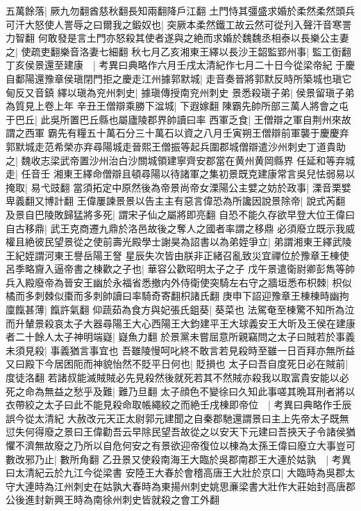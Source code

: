 五萬餘落|{
	厥九勿翻酋慈秋翻長知兩翻降戶江翻}
土門恃其彊盛求婚於柔然柔然頭兵可汗大怒使人詈辱之曰爾我之鍛奴也|{
	突厥本柔然鐵工故云然可從刋入聲汗音寒詈力智翻}
何敢發是言土門亦怒殺其使者遂與之絶而求婚於魏魏丞相泰以長樂公主妻之|{
	使疏吏翻樂音洛妻七細翻}
秋七月乙亥湘東王繹以長沙王韶監郢州事|{
	監工衘翻}
丁亥侯景還至建康　|{
	考異曰典略作六月壬戌太清紀作七月二十日今從梁帝紀}
于慶自鄱陽還豫章侯瑱閉門拒之慶走江州據郭默城|{
	走音奏晉將郭默反時所築城也瑱它甸反又音鎮}
繹以瑱為兖州刺史|{
	據瑱傳授南兖州刺史}
景悉殺瑱子弟|{
	侯景留瑱子弟為質見上卷上年}
辛丑王僧辯乘勝下湓城|{
	下遐嫁翻}
陳霸先帥所部三萬人將會之屯于巴丘|{
	此吳所置巴丘縣也屬廬陵郡界帥讀曰率}
西軍乏食|{
	王僧辯之軍自荆州來故謂之西軍}
霸先有糧五十萬石分三十萬石以資之八月壬寅朔王僧辯前軍襲于慶慶弃郭默城走范希榮亦弃尋陽城走晉熙王僧振等起兵圍郡城僧辯遣沙州刺史丁道貴助之|{
	魏收志梁武帝置沙州治白沙關城領建寧齊安郡當在黄州黄岡縣界}
任延和等弃城走|{
	任音壬}
湘東王繹命僧辯且頓尋陽以待諸軍之集初景既克建康常言吳兒怯弱易以掩取|{
	易弋豉翻}
當須拓定中原然後為帝景尚帝女溧陽公主嬖之妨於政事|{
	溧音栗嬖卑義翻又博計翻}
王偉屢諫景景以告主主有惡言偉恐為所讒因說景除帝|{
	說式芮翻}
及景自巴陵敗歸猛將多死|{
	謂宋子仙之屬將即亮翻}
自恐不能久存欲早登大位王偉曰自古移鼎|{
	武王克商遷九鼎於洛邑故後之奪人之國者率謂之移鼎}
必須廢立既示我威權且絶彼民望景從之使前壽光殿學士謝昊為詔書以為弟姪爭立|{
	弟謂湘東王繹武陵王紀姪謂河東王譽岳陽王詧}
星辰失次皆由朕非正緒召亂致災宜禪位於豫章王棟使呂季略齎入逼帝書之棟歡之子也|{
	華容公歡昭明太子之子}
戊午景遣衛尉卿彭雋等帥兵入殿廢帝為晉安王幽於永福省悉撤内外侍衛使突騎左右守之牆垣悉布枳棘|{
	枳似橘而多刺棘似棗而多刺帥讀曰率騎奇寄翻枳諸氏翻}
庚申下詔迎豫章王棟棟時幽拘廩餼甚薄|{
	餼許氣翻}
仰蔬茹為食方與妃張氏鉏葵|{
	葵菜也}
法駕奄至棟驚不知所為泣而升輦景殺哀太子大器尋陽王大心西陽王大鈞建平王大球義安王大昕及王侯在建康者二十餘人太子神明端嶷|{
	嶷魚力翻}
於景黨未嘗屈意所親竊問之太子曰賊若於事義未須見殺|{
	事義猶言事宜也}
吾雖陵慢呵叱終不敢言若見殺時至雖一日百拜亦無所益又曰殿下今居困阨而神貌怡然不貶平日何也|{
	貶損也}
太子曰吾自度死日必在賊前|{
	度徒洛翻}
若諸叔能滅賊賊必先見殺然後就死若其不然賊亦殺我以取富貴安能以必死之命為無益之愁乎及難|{
	難乃旦翻}
太子顔色不變徐曰久知此事嗟其晩耳刑者將以衣帶絞之太子曰此不能見殺命取帳繩絞之而絶壬戌棟即帝位　|{
	考異曰典略作壬辰誤今從太清紀}
大赦改元天正太尉郭元建聞之自秦郡馳還謂景曰主上先帝太子既無愆失何得廢之景曰王偉勸吾云早除民望吾故從之以安天下元建曰吾挾天子令諸侯猶懼不濟無故廢之乃所以自危何安之有景欲迎帝復位以棟為太孫王偉曰廢立大事豈可數改邪乃止|{
	數所角翻}
乙丑景又使殺南海王大臨於吳郡南郡王大連於姑孰　|{
	考異曰太清紀云於九江今從梁書}
安陸王大春於會稽高唐王大壯於京口|{
	大臨時為吳郡太守大連時為江州刺史在姑孰大春時為東揚州刺史姚思亷梁書大壯作大莊始封高唐郡公後進封新興王時為南徐州刺史皆就殺之會工外翻}
